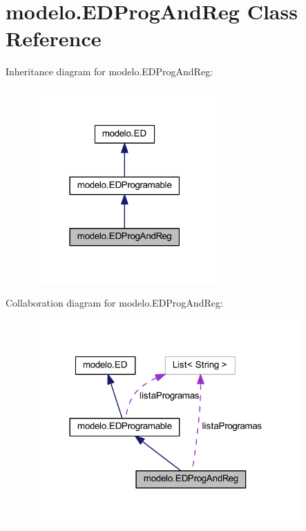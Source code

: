 \hypertarget{classmodelo_1_1_e_d_prog_and_reg}{}\section{modelo.\+E\+D\+Prog\+And\+Reg Class Reference}
\label{classmodelo_1_1_e_d_prog_and_reg}


Inheritance diagram for modelo.\+E\+D\+Prog\+And\+Reg\+:
\nopagebreak
\begin{figure}[H]
\begin{center}
\leavevmode
\includegraphics[width=199pt]{classmodelo_1_1_e_d_prog_and_reg__inherit__graph}
\end{center}
\end{figure}


Collaboration diagram for modelo.\+E\+D\+Prog\+And\+Reg\+:
\nopagebreak
\begin{figure}[H]
\begin{center}
\leavevmode
\includegraphics[width=290pt]{classmodelo_1_1_e_d_prog_and_reg__coll__graph}
\end{center}
\end{figure}
